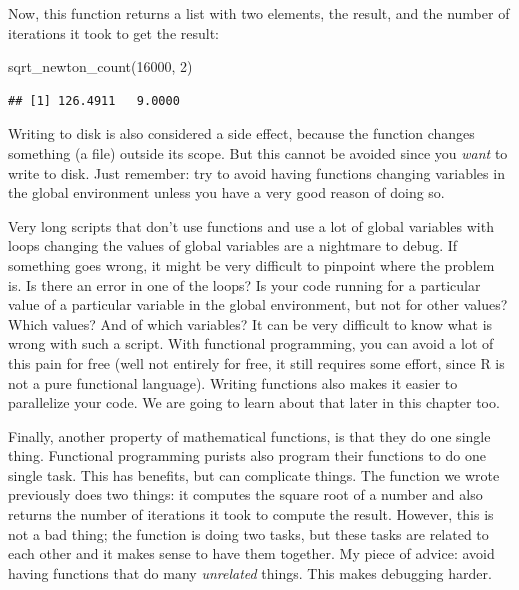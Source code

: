 \documentclass[
]{article}
\newenvironment{Shaded}{\begin{snugshade}}{\end{snugshade}}
\newcommand{\DecValTok}[1]{\textcolor[rgb]{0.00,0.00,0.81}{#1}}
\newcommand{\FunctionTok}[1]{\textcolor[rgb]{0.00,0.00,0.00}{#1}}
\newcommand{\NormalTok}[1]{#1}
\begin{document}
Now, this function returns a list with two elements, the result, and the number of iterations it
took to get the result:

\begin{Shaded}
\begin{Highlighting}[]
\FunctionTok{sqrt\_newton\_count}\NormalTok{(}\DecValTok{16000}\NormalTok{, }\DecValTok{2}\NormalTok{)}
\end{Highlighting}
\end{Shaded}

\begin{verbatim}
## [1] 126.4911   9.0000
\end{verbatim}

Writing to disk is also considered a side effect, because the function changes something (a file)
outside its scope. But this cannot be avoided since you \emph{want} to write to disk.
Just remember: try to avoid having functions changing variables in the global environment unless
you have a very good reason of doing so.

Very long scripts that don't use functions and use a lot of global variables with loops changing
the values of global variables are a nightmare to debug. If something goes wrong, it might be very
difficult to pinpoint where the problem is. Is there an error in one of the loops?
Is your code running for a particular value of a particular variable in the global environment, but
not for other values? Which values? And of which variables? It can be very difficult to know what
is wrong with such a script.
With functional programming, you can avoid a lot of this pain for free (well not entirely for free,
it still requires some effort, since R is not a pure functional language). Writing functions also
makes it easier to parallelize your code. We are going to learn about that later in this chapter too.

Finally, another property of mathematical functions, is that they do one single thing. Functional
programming purists also program their functions to do one single task. This has benefits, but
can complicate things. The function we wrote previously does two things: it computes the square
root of a number and also returns the number of iterations it took to compute the result. However,
this is not a bad thing; the function is doing two tasks, but these tasks are related to each other
and it makes sense to have them together. My piece of advice: avoid having functions that do
many \emph{unrelated} things. This makes debugging harder.
\end{document}
